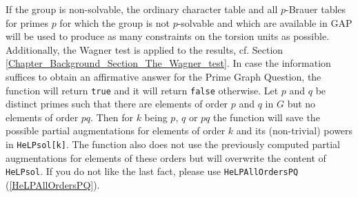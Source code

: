 \documentclass[a4paper,11pt]{report}
\begin{document}
{{{ If the group is non-solvable, the ordinary character table and all $p$-Brauer tables for primes $p$ for which the group is not $p$-solvable and which are available in GAP will be used to produce as many
constraints on the torsion units as possible. Additionally, the Wagner test is
applied to the results, cf. Section \ref{Chapter_Background_Section_The_Wagner_test}. In case the information suffices to obtain an affirmative answer for the
Prime Graph Question, the function will return \texttt{true} and it will return \texttt{false} otherwise. Let $p$ and $q$ be distinct primes such that there are elements of order $p$ and $q$ in $G$ but no elements of order $pq$. Then for $k$ being $p$, $q$ or $pq$ the function will save the possible partial augmentations for elements of
order $k$ and its (non-trivial) powers in \texttt{HeLP{\textunderscore}sol[k]}. The function also does not use the previously computed partial augmentations
for elements of these orders but will overwrite the content of \texttt{HeLP{\textunderscore}sol}. If you do not like the last fact, please use \texttt{HeLP{\textunderscore}AllOrdersPQ} (\ref{HeLPAllOrdersPQ}). }

 }

 }

   
\end{document}
